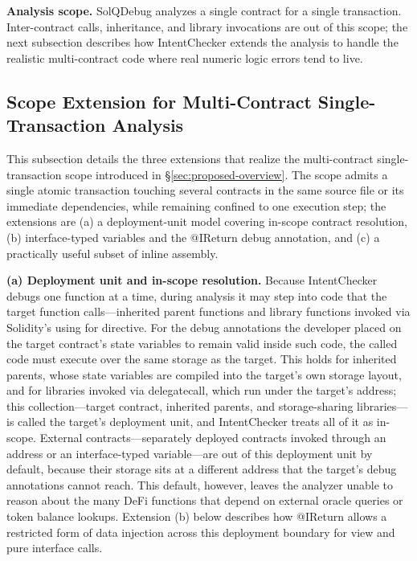 \documentclass[pdflatex,sn-basic]{sn-jnl}%
\theoremstyle{thmstyleone}%
\theoremstyle{thmstyletwo}%
\theoremstyle{thmstylethree}%
\begin{document}
\smallskip
\noindent\textbf{Analysis scope.}
SolQDebug analyzes a single contract for a single transaction.
Inter-contract calls, inheritance, and library invocations are out of this scope; the next subsection describes how IntentChecker extends the analysis to handle the realistic multi-contract code where real numeric logic errors tend to live.

\subsection{Scope Extension for Multi-Contract Single-Transaction Analysis}\label{sec:prelim:extension}

This subsection details the three extensions that realize the multi-contract single-transaction scope introduced in §\ref{sec:proposed-overview}.
The scope admits a single atomic transaction touching several contracts in the same source file or its immediate dependencies, while remaining confined to one execution step; the extensions are (a) a deployment-unit model covering in-scope contract resolution, (b) interface-typed variables and the @IReturn debug annotation, and (c) a practically useful subset of inline assembly.

\smallskip
\noindent\textbf{(a) Deployment unit and in-scope resolution.}
Because IntentChecker debugs one function at a time, during analysis it may step into code that the target function calls---inherited parent functions and library functions invoked via Solidity's using for directive.
For the debug annotations the developer placed on the target contract's state variables to remain valid inside such code, the called code must execute over the same storage as the target.
This holds for inherited parents, whose state variables are compiled into the target's own storage layout, and for libraries invoked via delegatecall, which run under the target's address;
this collection---target contract, inherited parents, and storage-sharing libraries---is called the target's deployment unit, and IntentChecker treats all of it as in-scope.
External contracts---separately deployed contracts invoked through an address or an interface-typed variable---are out of this deployment unit by default, because their storage sits at a different address that the target's debug annotations cannot reach.
This default, however, leaves the analyzer unable to reason about the many DeFi functions that depend on external oracle queries or token balance lookups.
Extension (b) below describes how @IReturn allows a restricted form of data injection across this deployment boundary for view and pure interface calls.
\end{document}
